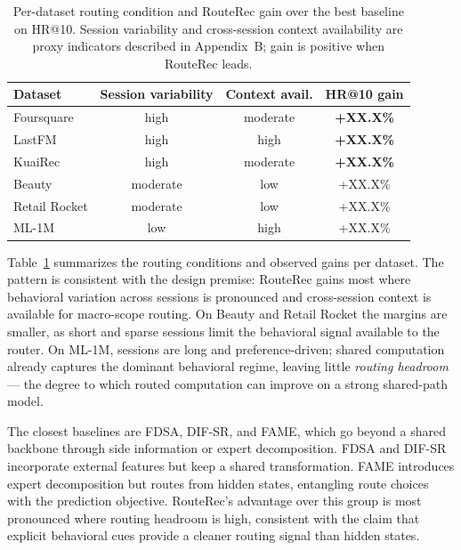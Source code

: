 \documentclass[sigconf,review,anonymous]{acmart}
\begin{document}
\begin{table}[t]
  \caption{Per-dataset routing condition and RouteRec gain over the best baseline on HR@10. Session variability and cross-session context availability are proxy indicators described in Appendix~B; gain is positive when RouteRec leads.}
  \label{tab:routing-condition}
  \centering
  \footnotesize
  \setlength{\tabcolsep}{4pt}
  \renewcommand{\arraystretch}{1.07}
  \begin{tabular}{lccc}
    \toprule
    Dataset & Session variability & Context avail. & HR@10 gain \\
    \midrule
    Foursquare   & high   & moderate & \textbf{+XX.X\%} \\
    LastFM       & high   & high     & \textbf{+XX.X\%} \\
    KuaiRec      & high   & moderate & \textbf{+XX.X\%} \\
    Beauty       & moderate & low    & +XX.X\% \\
    Retail Rocket & moderate & low   & +XX.X\% \\
    ML-1M        & low    & high     & +XX.X\% \\
    \bottomrule
  \end{tabular}
\end{table}

Table~\ref{tab:routing-condition} summarizes the routing conditions and observed gains per dataset. The pattern is consistent with the design premise: RouteRec gains most where behavioral variation across sessions is pronounced and cross-session context is available for macro-scope routing. On Beauty and Retail Rocket the margins are smaller, as short and sparse sessions limit the behavioral signal available to the router. On ML-1M, sessions are long and preference-driven; shared computation already captures the dominant behavioral regime, leaving little \emph{routing headroom} --- the degree to which routed computation can improve on a strong shared-path model.

The closest baselines are FDSA, DIF-SR, and FAME, which go beyond a shared backbone through side information or expert decomposition. FDSA and DIF-SR incorporate external features but keep a shared transformation. FAME introduces expert decomposition but routes from hidden states, entangling route choices with the prediction objective. RouteRec's advantage over this group is most pronounced where routing headroom is high, consistent with the claim that explicit behavioral cues provide a cleaner routing signal than hidden states.
\end{document}
